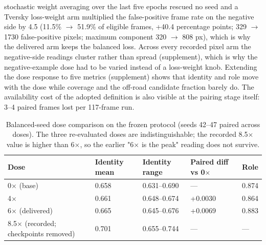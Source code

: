 \documentclass[journal]{IEEEtran}
\begin{document}
stochastic weight averaging \cite{izmailov2018swa} over the last five epochs rescued no seed and a Tversky
loss-weight arm multiplied the false-positive frame rate on the negative side by 4.5 (11.5\% $\rightarrow$ 51.9\% of
eligible frames, +40.4 percentage points; 329 $\rightarrow$ 1730 false-positive pixels; maximum component 320 $\rightarrow$ 808 px),
which is why the delivered arm keeps the balanced loss. Across every recorded pixel arm the negative-side readings cluster rather than spread (supplement), which is why the negative-example dose had to be varied instead of a loss-weight knob. Extending the dose response to five metrics (supplement) shows that identity and role move with the dose while coverage and the off-road candidate fraction barely do. The availability cost of the adopted definition is also visible at the pairing stage itself: 3--4 paired frames lost per 117-frame run.
\begin{table}[!t]
\centering
\caption{Balanced-seed dose comparison on the frozen protocol (seeds 42--47 paired across doses). The three re-evaluated doses are indistinguishable; the recorded 8.5$\times$ value is higher than 6$\times$, so the earlier "6$\times$ is the peak" reading does not survive.}
\begin{tabular}{@{}lllll@{}}
\toprule
Dose & Identity mean & Identity range & Paired diff vs 0$\times$ & Role \\
\midrule
0$\times$ (base) & 0.658 & 0.631--0.690 & --- & 0.874 \\
4$\times$ & 0.661 & 0.648--0.674 & +0.0030 & 0.864 \\
6$\times$ (delivered) & 0.665 & 0.645--0.676 & +0.0069 & 0.883 \\
8.5$\times$ (recorded; checkpoints removed) & 0.701 & 0.655--0.744 & --- & --- \\
\bottomrule
\end{tabular}
\end{table}
\end{document}
